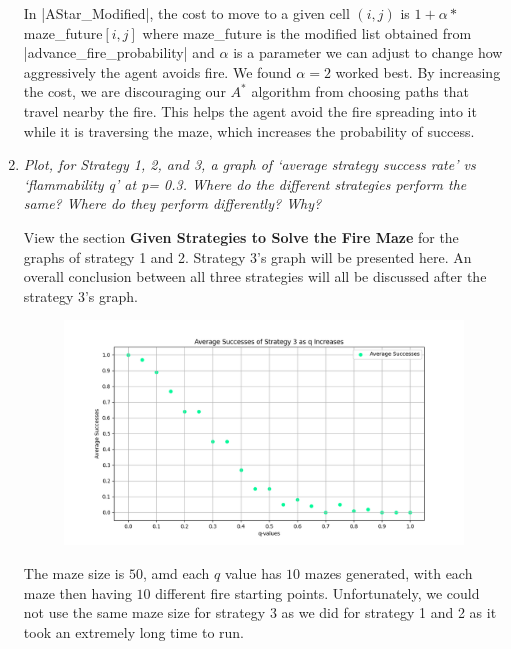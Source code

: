 \documentclass[12pt, twoside]{article}
\begin{document}
\begin{enumerate}
        \vspace{4mm}
        In \cverb|AStar_Modified|, the cost to move to a given cell $(i,j)$ is $1+\alpha *$ maze\_future$[i,j]$ where maze\_future is the modified list obtained from \cverb|advance_fire_probability| and $\alpha$ is a parameter we can adjust to change how aggressively the agent avoids fire. We found $\alpha = 2$ worked best. By increasing the cost, we are discouraging our $A^*$ algorithm from choosing paths that travel nearby the fire. This helps the agent avoid the fire spreading into it while it is traversing the maze, which increases the probability of success.

        \vfill

        \pagebreak
        
    \item 
        \textit{Plot,  for  Strategy  1,  2,  and  3,  a  graph  of  ‘average  strategy  success  rate’  vs  ‘flammability q’ at p= 0.3.  Where do the different strategies perform the same?  Where do they perform differently? Why?}

        \vspace{4mm}
        View the section \textbf{Given Strategies to Solve the Fire Maze} for the graphs of strategy 1 and 2. Strategy 3's graph will be presented here. An overall conclusion between all three strategies will all be discussed after the strategy 3's graph.

        \begin{figure}[h]
            \centering
            \includegraphics[scale = 0.6]{strategy_3_scatter.png}
        \end{figure}

        The maze size is $50$, amd each $q$ value has $10$ mazes generated, with each maze then having $10$ different fire starting points. Unfortunately, we could not use the same maze size for strategy 3 as we did for strategy 1 and 2 as it took an extremely long time to run.


\end{enumerate}
\end{document}
